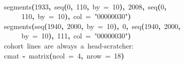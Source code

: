 \documentclass[a4paper]{article}
\newcommand{\hlnumber}[1]{\textcolor[rgb]{0.0823529411764706,0.0784313725490196,0.709803921568627}{#1}}%
\newcommand{\hlfunctioncall}[1]{\textcolor[rgb]{1,0,0}{#1}}%
\newcommand{\hlstring}[1]{\textcolor[rgb]{0.6,0.6,1}{#1}}%
\newcommand{\hlkeyword}[1]{\textcolor[rgb]{0,0,0}{\textbf{#1}}}%
\newcommand{\hlargument}[1]{\textcolor[rgb]{0.694117647058824,0.247058823529412,0.0196078431372549}{#1}}%
\newcommand{\hlcomment}[1]{\textcolor[rgb]{0.8,0.8,0.8}{#1}}%
\newcommand{\hlassignement}[1]{\textcolor[rgb]{0.215686274509804,0.215686274509804,0.384313725490196}{\textbf{#1}}}%
\newcommand{\hlsymbol}[1]{\textcolor[rgb]{0,0,0}{#1}}%
\newcommand{\hlprompt}[1]{\textcolor[rgb]{0,0,0}{#1}}%
\newcommand{\hlstd}[1]{\textcolor[rgb]{0,0,0}{#1}}%
\newenvironment{Houtput}{\raggedright}{%
%
}
\begin{document}
\begin{Houtput}
\hspace*{\fill}\\
\hlstd{}\ttfamily\noindent
\hlprompt{\usebox{\hlnormalsizeboxgreaterthan}{\ }}\hlfunctioncall{segments}\hlkeyword{(}\hlnumber{1933}\hlkeyword{,}{\ }\hlfunctioncall{seq}\hlkeyword{(}\hlnumber{0}\hlkeyword{,}{\ }\hlnumber{110}\hlkeyword{,}{\ }\hlargument{by}{\ }\hlargument{=}{\ }\hlnumber{10}\hlkeyword{)}\hlkeyword{,}{\ }\hlnumber{2008}\hlkeyword{,}{\ }\hlfunctioncall{seq}\hlkeyword{(}\hlnumber{0}\hlkeyword{,}\hspace*{\fill}\\
\hlstd{}\hlprompt{{\ }}{\ }{\ }{\ }{\ }\hlnumber{110}\hlkeyword{,}{\ }\hlargument{by}{\ }\hlargument{=}{\ }\hlnumber{10}\hlkeyword{)}\hlkeyword{,}{\ }\hlargument{col}{\ }\hlargument{=}{\ }\hlstring{"\usebox{\hlnormalsizeboxhash}00000030"}\hlkeyword{)}\mbox{}
\normalfont
\hspace*{\fill}\\
\hlstd{}\ttfamily\noindent
\hlprompt{\usebox{\hlnormalsizeboxgreaterthan}{\ }}\hlfunctioncall{segments}\hlkeyword{(}\hlfunctioncall{seq}\hlkeyword{(}\hlnumber{1940}\hlkeyword{,}{\ }\hlnumber{2000}\hlkeyword{,}{\ }\hlargument{by}{\ }\hlargument{=}{\ }\hlnumber{10}\hlkeyword{)}\hlkeyword{,}{\ }\hlnumber{0}\hlkeyword{,}{\ }\hlfunctioncall{seq}\hlkeyword{(}\hlnumber{1940}\hlkeyword{,}{\ }\hlnumber{2000}\hlkeyword{,}\hspace*{\fill}\\
\hlstd{}\hlprompt{{\ }}{\ }{\ }{\ }{\ }\hlargument{by}{\ }\hlargument{=}{\ }\hlnumber{10}\hlkeyword{)}\hlkeyword{,}{\ }\hlnumber{111}\hlkeyword{,}{\ }\hlargument{col}{\ }\hlargument{=}{\ }\hlstring{"\usebox{\hlnormalsizeboxhash}00000030"}\hlkeyword{)}\mbox{}
\normalfont
\hspace*{\fill}\\
\hlstd{}\ttfamily\noindent
\hlprompt{\usebox{\hlnormalsizeboxgreaterthan}{\ }}\hlcomment{\usebox{\hlnormalsizeboxhash}{\ }cohort{\ }lines{\ }are{\ }always{\ }a{\ }head-scratcher:}\mbox{}
\normalfont
\hspace*{\fill}\\
\hlstd{}\ttfamily\noindent
\hlprompt{\usebox{\hlnormalsizeboxgreaterthan}{\ }}\hlsymbol{cmat}{\ }\hlassignement{\usebox{\hlnormalsizeboxlessthan}-}{\ }\hlfunctioncall{matrix}\hlkeyword{(}\hlargument{ncol}{\ }\hlargument{=}{\ }\hlnumber{4}\hlkeyword{,}{\ }\hlargument{nrow}{\ }\hlargument{=}{\ }\hlnumber{18}\hlkeyword{)}\mbox{}
\normalfont
\hspace*{\fill}\\

\end{Houtput}
\end{document}
